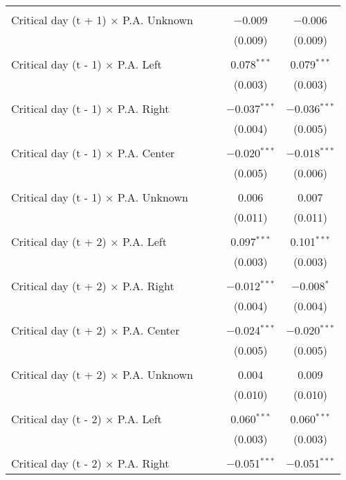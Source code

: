 \documentclass[
]{article}
\begin{document}
\begin{table}[!htbp]
{\begin{tabular}{@{\extracolsep{5pt}}lcccc}
  & & & & \\ 
 Critical day (t + 1) $\times$ P.A. Unknown &  &  & $-$0.009 & $-$0.006 \\ 
  &  &  & (0.009) & (0.009) \\ 
  & & & & \\ 
 Critical day (t - 1) $\times$ P.A. Left &  &  & 0.078$^{***}$ & 0.079$^{***}$ \\ 
  &  &  & (0.003) & (0.003) \\ 
  & & & & \\ 
 Critical day (t - 1) $\times$ P.A. Right &  &  & $-$0.037$^{***}$ & $-$0.036$^{***}$ \\ 
  &  &  & (0.004) & (0.005) \\ 
  & & & & \\ 
 Critical day (t - 1) $\times$ P.A. Center &  &  & $-$0.020$^{***}$ & $-$0.018$^{***}$ \\ 
  &  &  & (0.005) & (0.006) \\ 
  & & & & \\ 
 Critical day (t - 1) $\times$ P.A. Unknown &  &  & 0.006 & 0.007 \\ 
  &  &  & (0.011) & (0.011) \\ 
  & & & & \\ 
 Critical day (t + 2) $\times$ P.A. Left &  &  & 0.097$^{***}$ & 0.101$^{***}$ \\ 
  &  &  & (0.003) & (0.003) \\ 
  & & & & \\ 
 Critical day (t + 2) $\times$ P.A. Right &  &  & $-$0.012$^{***}$ & $-$0.008$^{*}$ \\ 
  &  &  & (0.004) & (0.004) \\ 
  & & & & \\ 
 Critical day (t + 2) $\times$ P.A. Center &  &  & $-$0.024$^{***}$ & $-$0.020$^{***}$ \\ 
  &  &  & (0.005) & (0.005) \\ 
  & & & & \\ 
 Critical day (t + 2) $\times$ P.A. Unknown &  &  & 0.004 & 0.009 \\ 
  &  &  & (0.010) & (0.010) \\ 
  & & & & \\ 
 Critical day (t - 2) $\times$ P.A. Left &  &  & 0.060$^{***}$ & 0.060$^{***}$ \\ 
  &  &  & (0.003) & (0.003) \\ 
  & & & & \\ 
 Critical day (t - 2) $\times$ P.A. Right &  &  & $-$0.051$^{***}$ & $-$0.051$^{***}$ \\ 

\end{tabular}}
\end{table}
\end{document}
